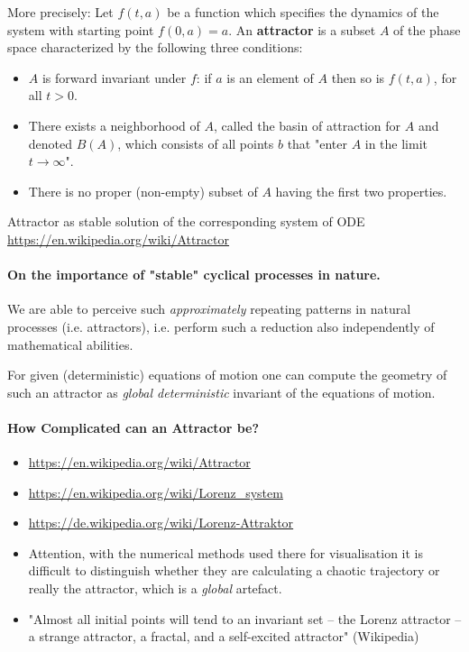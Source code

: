 \documentclass[11pt,a4paper]{article}
\begin{document}
More precisely: Let $f(t,a)$ be a function which specifies the dynamics of the
system with starting point $f(0,a)=a$. An \textbf{attractor} is a subset $A$
of the phase space characterized by the following three conditions:
\begin{itemize}
\item $A$ is forward invariant under $f$: if $a$ is an element of $A$ then so
  is $f(t,a)$, for all $t > 0$.  
\item There exists a neighborhood of $A$, called the basin of attraction for $A$
  and denoted $B(A)$, which consists of all points $b$ that "enter $A$ in the limit
  $t\to\infty$". 
\item There is no proper (non-empty) subset of $A$ having the first two
  properties.
\end{itemize}

Attractor as stable solution of the corresponding system of ODE\\
\url{https://en.wikipedia.org/wiki/Attractor}

\paragraph{On the importance of "stable" cyclical processes in nature.}
We are able to perceive such \emph{approximately} repeating patterns in
natural processes (i.e. attractors), i.e.  perform such a reduction also
independently of mathematical abilities.

For given (deterministic) equations of motion one can compute the geometry of
such an attractor as \emph{global deterministic} invariant of the equations of
motion.

\paragraph{How Complicated can an Attractor be?}
\begin{itemize}
\item \url{https://en.wikipedia.org/wiki/Attractor}
\item \url{https://en.wikipedia.org/wiki/Lorenz_system}
\item \url{https://de.wikipedia.org/wiki/Lorenz-Attraktor}
\item Attention, with the numerical methods used there for visualisation it is
  difficult to distinguish whether they are calculating a chaotic trajectory
  or really the attractor, which is a \emph{global} artefact.
\item "Almost all initial points will tend to an invariant set – the Lorenz
  attractor – a strange attractor, a fractal, and a self-excited attractor"
  (Wikipedia)
\end{itemize}
\end{document}
